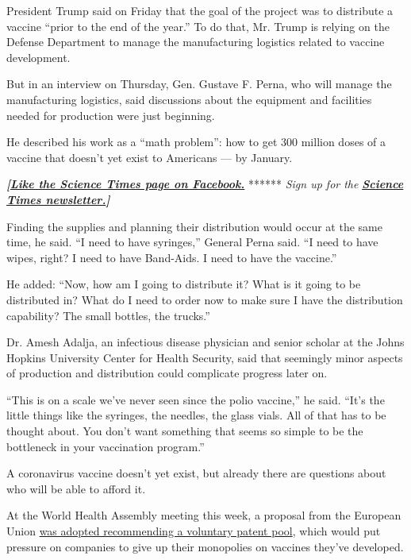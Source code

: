 President Trump said on Friday that the goal of the project was to
distribute a vaccine ``prior to the end of the year.'' To do that, Mr.
Trump is relying on the Defense Department to manage the manufacturing
logistics related to vaccine development.

But in an interview on Thursday, Gen. Gustave F. Perna, who will manage
the manufacturing logistics, said discussions about the equipment and
facilities needed for production were just beginning.

He described his work as a ``math problem'': how to get 300 million
doses of a vaccine that doesn't yet exist to Americans --- by January.

\textbf{\emph{{[}}\href{http://on.fb.me/1paTQ1h}{\emph{Like the Science
Times page on Facebook.}}} ****** \emph{\textbar{} Sign up for the}
\textbf{\href{http://nyti.ms/1MbHaRU}{\emph{Science Times
newsletter.}}\emph{{]}}}

Finding the supplies and planning their distribution would occur at the
same time, he said. ``I need to have syringes,'' General Perna said. ``I
need to have wipes, right? I need to have Band-Aids. I need to have the
vaccine.''

He added: ``Now, how am I going to distribute it? What is it going to be
distributed in? What do I need to order now to make sure I have the
distribution capability? The small bottles, the trucks.''

Dr. Amesh Adalja, an infectious disease physician and senior scholar at
the Johns Hopkins University Center for Health Security, said that
seemingly minor aspects of production and distribution could complicate
progress later on.

``This is on a scale we've never seen since the polio vaccine,'' he
said. ``It's the little things like the syringes, the needles, the glass
vials. All of that has to be thought about. You don't want something
that seems so simple to be the bottleneck in your vaccination program.''

A coronavirus vaccine doesn't yet exist, but already there are questions
about who will be able to afford it.

At the World Health Assembly meeting this week, a proposal from the
European Union
\href{https://www.reuters.com/article/us-health-coronavirus-who-resolution/eu-resolution-on-pandemic-adopted-at-who-assembly-official-idUSKBN22V1RS}{was
adopted recommending a voluntary patent pool}, which would put pressure
on companies to give up their monopolies on vaccines they've developed.

